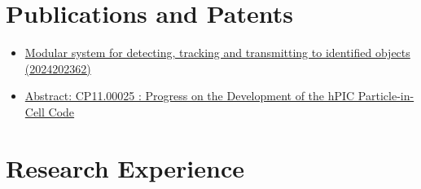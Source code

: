 \documentclass[letterpaper]{article}
\newenvironment{details}
{\begin{itemize}}
{\end{itemize}}
\begin{document}

   \section{Publications and Patents }
  \noindent
  \begin{details}
    \item \hyperlink{https://patents.justia.com/patent/11916279}{Modular system for detecting, tracking and transmitting to identified objects (2024202362)}
        \item \hyperlink{http://meetings.aps.org/link/BAPS.2017.DPP.CP11.25}{Abstract: CP11.00025 : Progress on the Development of the hPIC Particle-in-Cell Code}
  \end{details}

  \section{Research Experience}
\end{document}
